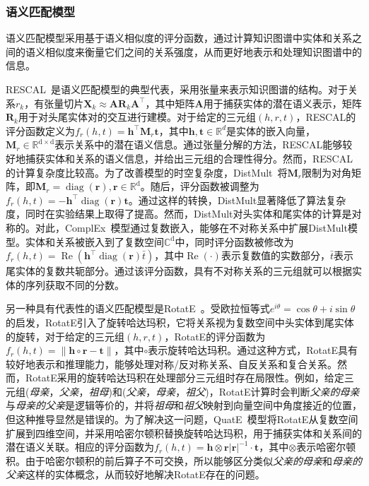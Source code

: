 \documentclass[algorithmlist, AutoFakeBold, AutoFakeSlant, figurelist, tablelist, nomlist, engineering, openany]{seuthesix} %
\begin{document}
\subsubsection{语义匹配模型}
语义匹配模型采用基于语义相似度的评分函数，通过计算知识图谱中实体和关系之间的语义相似度来衡量它们之间的关系强度，从而更好地表示和处理知识图谱中的信息。

RESCAL~\cite{nickel2011three}是语义匹配模型的典型代表，采用张量来表示知识图谱的结构。对于关系$r_k$，有张量切片$\mathbf{X}_k \approx \mathbf{A} \mathbf{R}_k \mathbf{A}^{\top}$，其中矩阵$\mathbf{A}$用于捕获实体的潜在语义表示，矩阵$\mathbf{R}_k$用于对头尾实体对的交互进行建模。对于给定的三元组$(h, r, t)$，RESCAL的评分函数定义为$f_r(h, t)=\bm{h}^{\top} \mathbf{M}_r \bm{t}$，其中$\bm{h}, \bm{t} \in \mathbb{R}^d$是实体的嵌入向量，$\mathbf{M}_r \in \mathbb{R}^\mathrm{d \times d}$表示关系中的潜在语义信息。通过张量分解的方法，RESCAL能够较好地捕获实体和关系的语义信息，并给出三元组的合理性得分。然而，RESCAL的计算复杂度比较高。为了改善模型的时空复杂度，DistMult~\cite{yang2015embedding}将$\mathbf{M}_r$限制为对角矩阵，即$\mathbf{M}_r=\operatorname{diag}(\bm{r}), \bm{r} \in \mathbb{R}^\mathrm{d}$。随后，评分函数被调整为$f_r(h, t)=-\bm{h}^{\top} \operatorname{diag}(\bm{r}) \bm{t}$。通过这样的转换，DistMult显著降低了算法复杂度，同时在实验结果上取得了提高。然而，DistMult对头实体和尾实体的计算是对称的。对此，ComplEx~\cite{trouillon2016complex}模型通过复数嵌入，能够在不对称关系中扩展DistMult模型。实体和关系被嵌入到了复数空间$\mathbb{C}^\mathrm{d}$中，同时评分函数被修改为$f_r(h, t)=\operatorname{Re}\left(\bm{h}^{\top} \operatorname{diag}(\bm{r}) \bar{t}\right)$，其中$\operatorname{Re}(\cdot)$表示复数值的实数部分，$\bar{t}$表示尾实体的复数共轭部分。通过该评分函数，具有不对称关系的三元组就可以根据实体的序列获取不同的分数。

另一种具有代表性的语义匹配模型是RotatE~\cite{sun2018rotate}。受欧拉恒等式$e^{i \theta}=\cos \theta + i \sin \theta$的启发，RotatE引入了旋转哈达玛积，它将关系视为复数空间中头实体到尾实体的旋转，对于给定的三元组$(h, r, t)$，RotatE的评分函数为$f_r(h, t) = \|\bm{h} \circ \bm{r} - \bm{t}\|$，其中$\circ$表示旋转哈达玛积。通过这种方式，RotatE具有较好地表示和推理能力，能够处理对称/反对称关系、自反关系和复合关系。然而，RotatE采用的旋转哈达玛积在处理部分三元组时存在局限性。例如，给定三元组(\textit{母亲}，\textit{父亲}，\textit{祖母})和(\textit{父亲}，\textit{母亲}，\textit{祖父})，RotatE计算时会判断\textit{父亲的母亲}与\textit{母亲的父亲}是逻辑等价的，并将\textit{祖母}和\textit{祖父}映射到向量空间中角度接近的位置，但这种推导显然是错误的。为了解决这一问题，QuatE~\cite{zhang2019quaternion}模型将RotatE从复数空间扩展到四维空间，并采用哈密尔顿积替换旋转哈达玛积，用于捕获实体和关系间的潜在语义关联。相应的评分函数为$f_r(h, t)=\bm{h} \otimes \bm{r}|\bm{r}|^{-1} \cdot \bm{t}$，其中$\otimes$表示哈密尔顿积。由于哈密尔顿积的前后算子不可交换，所以能够区分类似\textit{父亲的母亲}和\textit{母亲的父亲}这样的实体概念，从而较好地解决RotatE存在的问题。
\end{document}
